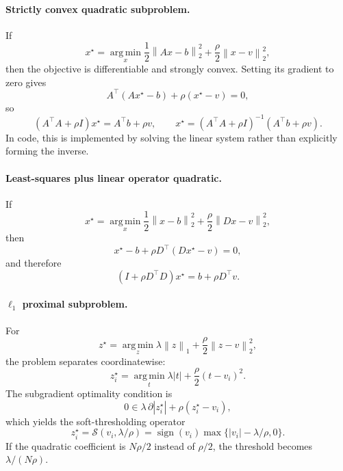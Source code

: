 \documentclass[11pt]{article}
\newcommand{\argmin}{\operatorname*{arg\,min}}
\newcommand{\shrink}{\mathcal{S}}
\newcommand{\norm}[1]{\left\lVert #1 \right\rVert}
\begin{document}
\paragraph{Strictly convex quadratic subproblem.}
If
\begin{equation}
    x^\star
    =
    \argmin_x
    \frac{1}{2}\norm{Ax-b}_2^2
    +
    \frac{\rho}{2}\norm{x-v}_2^2,
\end{equation}
then the objective is differentiable and strongly convex.  Setting its
gradient to zero gives
\begin{equation}
    A^\top(Ax^\star-b)+\rho(x^\star-v)=0,
\end{equation}
so
\begin{equation}
    (A^\top A+\rho I)x^\star=A^\top b+\rho v,
    \qquad
    x^\star=(A^\top A+\rho I)^{-1}(A^\top b+\rho v).
    \label{eq:generic-quadratic-argmin}
\end{equation}
In code, this is implemented by solving the linear system rather than
explicitly forming the inverse.

\paragraph{Least-squares plus linear operator quadratic.}
If
\begin{equation}
    x^\star
    =
    \argmin_x
    \frac{1}{2}\norm{x-b}_2^2
    +
    \frac{\rho}{2}\norm{Dx-v}_2^2,
\end{equation}
then
\begin{equation}
    x^\star-b+\rho D^\top(Dx^\star-v)=0,
\end{equation}
and therefore
\begin{equation}
    (I+\rho D^\top D)x^\star=b+\rho D^\top v.
    \label{eq:generic-operator-quadratic-argmin}
\end{equation}

\paragraph{\(\ell_1\) proximal subproblem.}
For
\begin{equation}
    z^\star
    =
    \argmin_z
    \lambda\norm{z}_1+\frac{\rho}{2}\norm{z-v}_2^2,
\end{equation}
the problem separates coordinatewise:
\begin{equation}
    z_i^\star
    =
    \argmin_t
    \lambda |t|+\frac{\rho}{2}(t-v_i)^2 .
\end{equation}
The subgradient optimality condition is
\begin{equation}
    0\in \lambda\,\partial |z_i^\star|+\rho(z_i^\star-v_i),
\end{equation}
which yields the soft-thresholding operator
\begin{equation}
    z_i^\star
    =
    \shrink(v_i,\lambda/\rho)
    =
    \operatorname{sign}(v_i)\max\{|v_i|-\lambda/\rho,0\}.
    \label{eq:generic-soft-threshold-argmin}
\end{equation}
If the quadratic coefficient is $N\rho/2$ instead of $\rho/2$, the threshold
becomes $\lambda/(N\rho)$.
\end{document}
